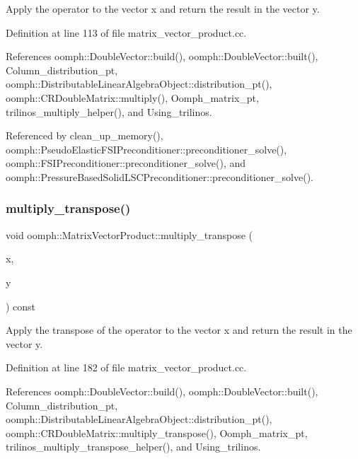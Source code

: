 Apply the operator to the vector x and return the result in the vector y. 



Definition at line 113 of file matrix\+\_\+vector\+\_\+product.\+cc.



References oomph\+::\+Double\+Vector\+::build(), oomph\+::\+Double\+Vector\+::built(), Column\+\_\+distribution\+\_\+pt, oomph\+::\+Distributable\+Linear\+Algebra\+Object\+::distribution\+\_\+pt(), oomph\+::\+C\+R\+Double\+Matrix\+::multiply(), Oomph\+\_\+matrix\+\_\+pt, trilinos\+\_\+multiply\+\_\+helper(), and Using\+\_\+trilinos.



Referenced by clean\+\_\+up\+\_\+memory(), oomph\+::\+Pseudo\+Elastic\+F\+S\+I\+Preconditioner\+::preconditioner\+\_\+solve(), oomph\+::\+F\+S\+I\+Preconditioner\+::preconditioner\+\_\+solve(), and oomph\+::\+Pressure\+Based\+Solid\+L\+S\+C\+Preconditioner\+::preconditioner\+\_\+solve().

\mbox{\label{classoomph_1_1MatrixVectorProduct_a2b7670797fe289ea814968f2f9469fd5}} 
\subsubsection{\texorpdfstring{multiply\+\_\+transpose()}{multiply\_transpose()}}
{\footnotesize\ttfamily void oomph\+::\+Matrix\+Vector\+Product\+::multiply\+\_\+transpose (\begin{DoxyParamCaption}\item[{const \hyperlink{classoomph_1_1DoubleVector}{Double\+Vector} \&}]{x,  }\item[{\hyperlink{classoomph_1_1DoubleVector}{Double\+Vector} \&}]{y }\end{DoxyParamCaption}) const}



Apply the transpose of the operator to the vector x and return the result in the vector y. 



Definition at line 182 of file matrix\+\_\+vector\+\_\+product.\+cc.



References oomph\+::\+Double\+Vector\+::build(), oomph\+::\+Double\+Vector\+::built(), Column\+\_\+distribution\+\_\+pt, oomph\+::\+Distributable\+Linear\+Algebra\+Object\+::distribution\+\_\+pt(), oomph\+::\+C\+R\+Double\+Matrix\+::multiply\+\_\+transpose(), Oomph\+\_\+matrix\+\_\+pt, trilinos\+\_\+multiply\+\_\+transpose\+\_\+helper(), and Using\+\_\+trilinos.



